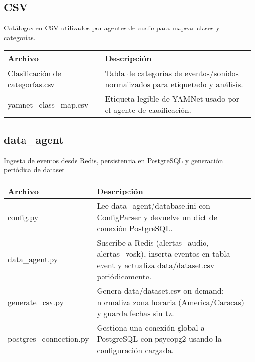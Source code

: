 \subsection*{CSV}

Catálogos en CSV utilizados por agentes de audio para mapear clases y categorías.

\begin{table}[H]
  \doublespacing
  \begin{tabularx}{\textwidth}{l X}
    \hline
    \textbf{Archivo}                & \textbf{Descripción}                          \\
    \hline
    Clasificación de categorías.csv &
    Tabla de categorías de eventos/sonidos normalizados para etiquetado y análisis. \\
    yamnet\_class\_map.csv          &
    Etiqueta legible de YAMNet usado por el agente de clasificación.                \\
    \hline
  \end{tabularx}
\end{table}

\subsection*{data\_agent}

Ingesta de eventos desde Redis, persistencia en PostgreSQL y generación periódica de dataset

\begin{table}[H]
  \doublespacing
  \begin{tabularx}{\textwidth}{l X}
    \hline
    \textbf{Archivo}        & \textbf{Descripción}                                                                                                          \\
    \hline
    config.py               & Lee data\_agent/database.ini con ConfigParser y devuelve un dict de conexión PostgreSQL.                                      \\
    data\_agent.py          & Suscribe a Redis (alertas\_audio, alertas\_vosk), inserta eventos en tabla event y actualiza data/dataset.csv periódicamente. \\
    generate\_csv.py        & Genera data/dataset.csv on-demand; normaliza zona horaria (America/Caracas) y guarda fechas sin tz.                           \\
    postgres\_connection.py & Gestiona una conexión global a PostgreSQL con psycopg2 usando la configuración cargada.                                       \\
    \hline
  \end{tabularx}
\end{table}

